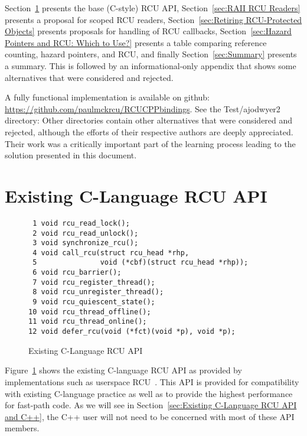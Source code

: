 \documentclass[letterpaper,10pt]{article}
\begin{document}
Section~\ref{sec:Existing C-Language RCU API} presents the base (C-style) RCU API,
Section~\ref{sec:RAII RCU Readers} presents a proposal for scoped RCU readers,
Section~\ref{sec:Retiring RCU-Protected Objects} presents proposals for handling of
RCU callbacks,
Section~\ref{sec:Hazard Pointers and RCU: Which to Use?} presents a
table comparing reference counting, hazard pointers, and RCU, and finally
Section~\ref{sec:Summary} presents a summary.
This is followed by an informational-only appendix that shows
some alternatives that were considered and rejected.

A fully functional implementation is available on github:
\url{https://github.com/paulmckrcu/RCUCPPbindings}.
See the Test/ajodwyer2 directory: Other directories contain other
alternatives that were considered and rejected, although the efforts
of their respective authors are deeply appreciated.
Their work was a critically important part of the learning process
leading to the solution presented in this document.

\section{Existing C-Language RCU API}
\label{sec:Existing C-Language RCU API}

\begin{figure}[tbp]
{ \scriptsize
\begin{verbatim}
 1 void rcu_read_lock();
 2 void rcu_read_unlock();
 3 void synchronize_rcu();
 4 void call_rcu(struct rcu_head *rhp,
 5               void (*cbf)(struct rcu_head *rhp));
 6 void rcu_barrier();
 7 void rcu_register_thread();
 8 void rcu_unregister_thread();
 9 void rcu_quiescent_state();
10 void rcu_thread_offline();
11 void rcu_thread_online();
12 void defer_rcu(void (*fct)(void *p), void *p);
\end{verbatim}
}
\caption{Existing C-Language RCU API}
\label{fig:Existing C-Language RCU API}
\end{figure}

Figure~\ref{fig:Existing C-Language RCU API}
shows the existing C-language RCU API as provided by implementations such as
userspace RCU~\cite{MathieuDesnoyers2009URCU,PaulMcKenney2013LWNURCU}.
This API is provided for compatibility with existing C-language practice as
well as to provide the highest performance for fast-path code.
As we will see in
Section~\ref{sec:Existing C-Language RCU API and C++},
the C++ user will not need to be concerned with most
of these API members.
\end{document}
